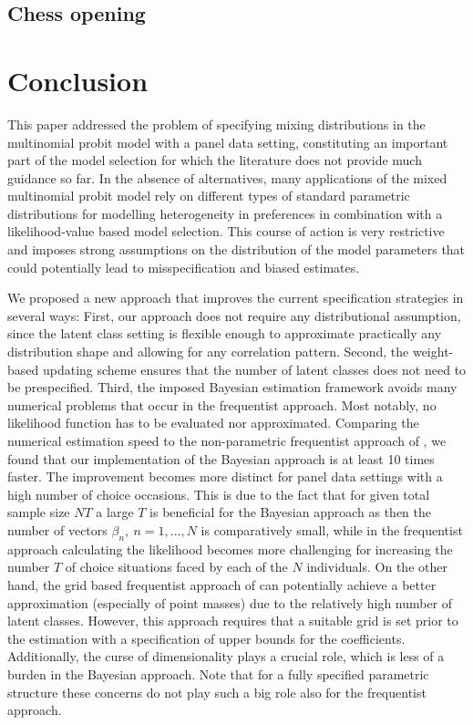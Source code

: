 \documentclass[article]{jss}
\begin{document}
\subsection{Chess opening} \label{subsec:chess}


\section{Conclusion} \label{sec:conclusion}

This paper addressed the problem of specifying mixing distributions in the multinomial probit model with a panel data setting, constituting an important part of the model selection for which the literature does not provide much guidance so far. In the absence of alternatives, many applications of the mixed multinomial probit model rely on different types of standard parametric distributions for modelling heterogeneity in preferences in combination with a likelihood-value based model selection. This course of action is very restrictive and imposes strong assumptions on the distribution of the model parameters that could potentially lead to misspecification and biased estimates.

We proposed a new approach that improves the current specification strategies in several ways: First, our approach does not require any distributional assumption, since the latent class setting is flexible enough to approximate practically any distribution shape and allowing for any correlation pattern. Second, the weight-based updating scheme ensures that the number of latent classes does not need to be prespecified. Third, the imposed Bayesian estimation framework avoids many numerical problems that occur in the frequentist approach. Most notably, no likelihood function has to be evaluated nor approximated. Comparing the numerical estimation speed to the non-parametric frequentist approach of \cite{Bauer:19}, we found that our implementation of the Bayesian approach is at least 10 times faster. The improvement becomes more distinct for panel data settings with a high number of choice occasions. This is due to the fact that for given total sample size $NT$ a large $T$ is beneficial for the Bayesian approach as then the number of vectors $\beta_n,~ n = 1,...,N$ is comparatively small, while in the frequentist approach calculating the likelihood becomes more challenging for increasing the number $T$ of choice situations faced by each of the $N$ individuals. On the other hand, the grid based frequentist approach of \cite{Bauer:19} can potentially achieve a better approximation (especially of point masses) due to the relatively high number of latent classes. However, this approach requires that a suitable grid is set prior to the estimation with a specification of upper bounds for the coefficients. Additionally, the curse of dimensionality plays a crucial role, which is less of a burden in the Bayesian approach. Note that for a fully specified parametric structure these concerns do not play such a big role also for the frequentist approach.
\end{document}
